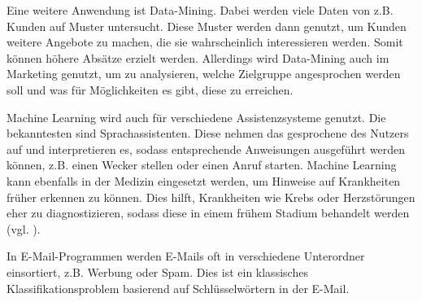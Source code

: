 Eine weitere Anwendung ist Data-Mining. Dabei werden viele Daten von z.B. Kunden auf Muster untersucht. Diese Muster werden dann genutzt, um Kunden weitere Angebote zu machen, die sie wahrscheinlich interessieren werden. Somit können höhere Absätze erzielt werden. Allerdings wird Data-Mining auch im Marketing genutzt, um zu analysieren, welche Zielgruppe angesprochen werden soll und was für Möglichkeiten es gibt, diese zu erreichen.

Machine Learning wird auch für verschiedene Assistenzsysteme genutzt. Die bekanntesten sind Sprachassistenten. Diese nehmen das gesprochene des Nutzers auf und interpretieren es, sodass entsprechende Anweisungen ausgeführt werden können, z.B. einen Wecker stellen oder einen Anruf starten.
Machine Learning kann ebenfalls in der Medizin eingesetzt werden, um Hinweise auf Krankheiten früher erkennen zu können. Dies hilft, Krankheiten wie Krebs oder Herzstörungen eher zu diagnostizieren, sodass diese in einem frühem Stadium behandelt werden (vgl. \cite[]{AnwendungsBsp}).

In E-Mail-Programmen werden E-Mails oft in verschiedene Unterordner einsortiert, z.B. Werbung oder Spam. Dies ist ein klassisches Klassifikationsproblem basierend auf Schlüsselwörtern in der E-Mail.